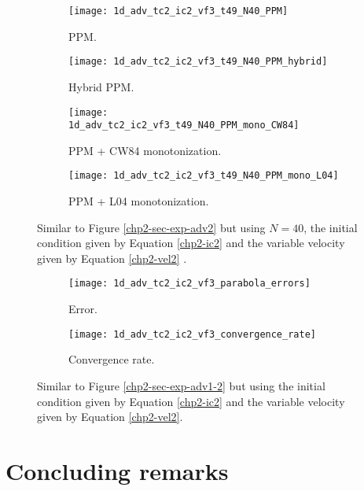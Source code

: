 \begin{figure}[!htb]
  \centering
  \begin{subfigure}{0.49\textwidth}
    \centering
			\texttt{[image: 1d\_adv\_tc2\_ic2\_vf3\_t49\_N40\_PPM]}
			\caption{PPM.\label{chp2-sec-exp-adv6-a}}
  \end{subfigure}
  \begin{subfigure}{0.49\textwidth}
    \centering
			\texttt{[image: 1d\_adv\_tc2\_ic2\_vf3\_t49\_N40\_PPM\_hybrid]}
			\caption{Hybrid PPM.\label{chp2-sec-exp-adv6-b}}
  \end{subfigure}

  \begin{subfigure}{0.49\textwidth}
    \centering
		\texttt{[image: 1d\_adv\_tc2\_ic2\_vf3\_t49\_N40\_PPM\_mono\_CW84]}
    \caption{PPM + CW84 monotonization.\label{chp2-sec-exp-adv6-c}}
  \end{subfigure}
  \begin{subfigure}{0.49\textwidth}
    \centering
			\texttt{[image: 1d\_adv\_tc2\_ic2\_vf3\_t49\_N40\_PPM\_mono\_L04]}
      \caption{PPM + L04 monotonization.\label{chp2-sec-exp-adv6-d}}
  \end{subfigure} 
	\caption{ Similar to Figure \ref{chp2-sec-exp-adv2} but using $N=40$, 
	the initial condition given by Equation \eqref{chp2-ic2} and the variable velocity given by Equation
	\eqref{chp2-vel2} \label{chp2-sec-exp-adv6}.}
\end{figure}

\begin{figure}[!htb]
  \centering
  \begin{subfigure}{0.49\textwidth}
    \centering
		\texttt{[image: 1d\_adv\_tc2\_ic2\_vf3\_parabola\_errors]}
		\caption{Error.\label{chp2-sec-exp-adv6-error}}
  \end{subfigure}
  \begin{subfigure}{0.49\textwidth}
    \centering
			\texttt{[image: 1d\_adv\_tc2\_ic2\_vf3\_convergence\_rate]}
		\caption{Convergence rate.\label{chp2-sec-exp-adv6-CR}}
  \end{subfigure}
	\caption{ Similar to Figure \ref{chp2-sec-exp-adv1-2} but using
	the initial condition given by Equation	\eqref{chp2-ic2} and the variable 
	velocity given by Equation \eqref{chp2-vel2}.\label{chp2-sec-exp-adv6-2}}
\end{figure}

\newpage
\section{Concluding remarks}
\label{chp2-sec-conclusion}